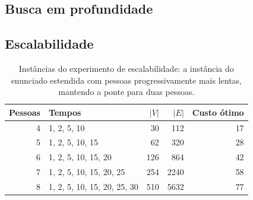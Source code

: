 \documentclass[12pt,a4paper]{article}
\begin{document}
\subsection{Busca em profundidade}
\label{sec:discussao-dfs}

\subsection{Escalabilidade}
\label{sec:escalabilidade}

\begin{table}[H]
  \centering
  \caption{Instâncias do experimento de escalabilidade: a instância do enunciado estendida com pessoas progressivamente mais lentas, mantendo a ponte para duas pessoas.}
  \label{tab:instancias}
  \begin{tabular}{rlrrr}
    \toprule
    Pessoas & Tempos & $|V|$ & $|E|$ & Custo ótimo \\
    \midrule
    4 & 1, 2, 5, 10                 &  30 &  112 & 17 \\
    5 & 1, 2, 5, 10, 15             &  62 &  320 & 28 \\
    6 & 1, 2, 5, 10, 15, 20         & 126 &  864 & 42 \\
    7 & 1, 2, 5, 10, 15, 20, 25     & 254 & 2240 & 58 \\
    8 & 1, 2, 5, 10, 15, 20, 25, 30 & 510 & 5632 & 77 \\
    \bottomrule
  \end{tabular}
\end{table}
\end{document}
